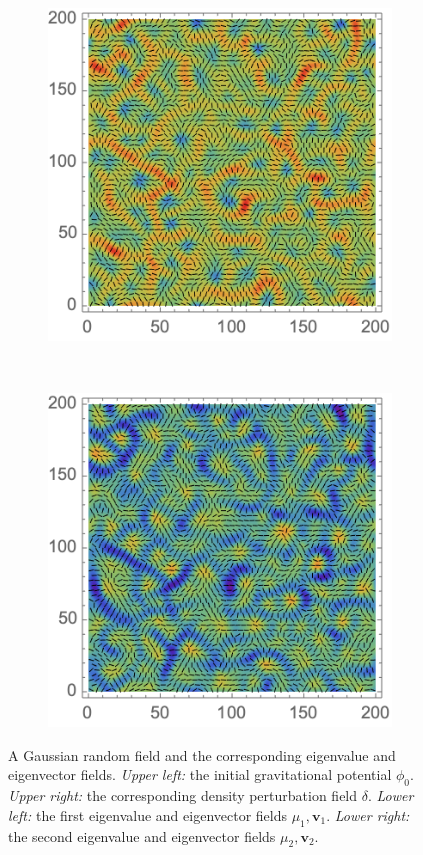 \documentclass[a4paper, 11pt]{article}
\begin{document}
\begin{figure}
\begin{subfigure}[b]{0.49\textwidth}
\end{subfigure}\\
\begin{subfigure}[b]{0.49\textwidth}
\includegraphics[width=\textwidth]{Lambda_1}
\end{subfigure}~
\begin{subfigure}[b]{0.49\textwidth}
\includegraphics[width=\textwidth]{Lambda_2}
\end{subfigure}
\caption{A Gaussian random field and the corresponding eigenvalue and eigenvector fields. \textit{Upper left:} the initial gravitational potential $\phi_0$. \textit{Upper right:} the corresponding density perturbation field $\delta$. \textit{Lower left:} the first eigenvalue and eigenvector fields $\mu_1,\bm{v}_1$. \textit{Lower right:} the second eigenvalue and eigenvector fields $\mu_2,\bm{v}_2$.}
\label{fig:Initial_Conditions}
\end{figure}
\end{document}
